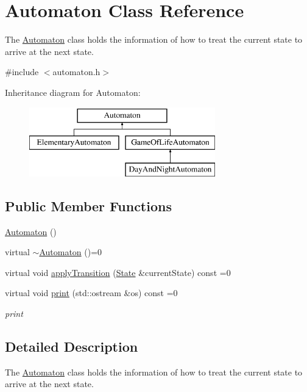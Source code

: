 \hypertarget{class_automaton}{}\section{Automaton Class Reference}
\label{class_automaton}


The \mbox{\hyperlink{class_automaton}{Automaton}} class holds the information of how to treat the current state to arrive at the next state.  




{\ttfamily \#include $<$automaton.\+h$>$}

Inheritance diagram for Automaton\+:\begin{figure}[H]
\begin{center}
\leavevmode
\includegraphics[height=3.000000cm]{class_automaton}
\end{center}
\end{figure}
\subsection*{Public Member Functions}
\begin{DoxyCompactItemize}
\item 
\mbox{\hyperlink{class_automaton_a5d2b6e09517175faea87c5724cc3edea}{Automaton}} ()
\item 
virtual \mbox{\hyperlink{class_automaton_ac3355a85bde027da7193736545bb2dac}{$\sim$\+Automaton}} ()=0
\item 
virtual void \mbox{\hyperlink{class_automaton_aaf6b5ebd7a820867bfaab0f6892cc0b8}{apply\+Transition}} (\mbox{\hyperlink{class_state}{State}} \&current\+State) const =0
\item 
virtual void \mbox{\hyperlink{class_automaton_a33107fc96cfe40a75db43b7403dd3194}{print}} (std\+::ostream \&os) const =0
\begin{DoxyCompactList}\small\item\em print \end{DoxyCompactList}\end{DoxyCompactItemize}


\subsection{Detailed Description}
The \mbox{\hyperlink{class_automaton}{Automaton}} class holds the information of how to treat the current state to arrive at the next state. 

